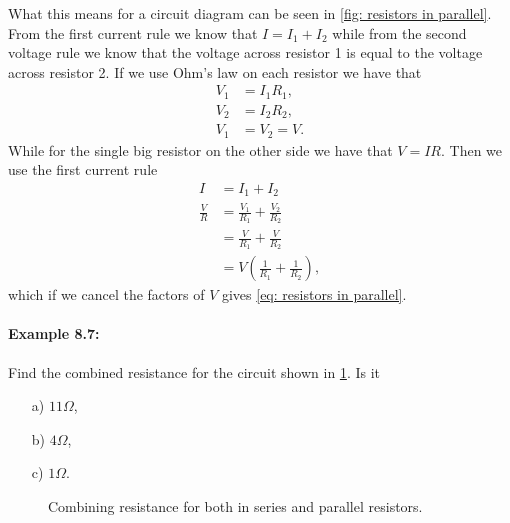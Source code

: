 \documentclass[a4paper,12pt]{book}
\begin{document}
What this means for a circuit diagram can be seen in \cref{fig: resistors in parallel}.  From the first current rule we know that $I=I_{1}+I_{2}$ while from the second voltage rule we know that the voltage across resistor 1 is equal to the voltage across resistor 2. If we use Ohm's law on each resistor we have that 
\begin{align*}
V_{1}&=I_{1} R_{1},\\
V_{2}&=I_{2} R_{2},\\
V_{1}&=V_{2}=V.
\end{align*}
While for the single big resistor on the other side we have that $V=IR$.  Then we use the first current rule 
\begin{align*}
I&=I_{1}+I_{2}\\
\frac{V}{R}&=\frac{V_{1}}{R_{1}}+\frac{V_{2}}{R_{2}}\\
&=\frac{V}{R_{1}}+\frac{V}{R_{2}}\\
&=V\left(\frac{1}{R_{1}}+\frac{1}{R_{2}}\right),
\end{align*}
which if we cancel the factors of $V$ gives \cref{eq: resistors in parallel}.

\paragraph{Example 8.7:} Find the combined resistance for the circuit shown in \cref{fig: combining resistance example}. Is it
\begin{itemize}
\setlength{\itemsep}{-5pt}
    \item[a)] $11\Omega$,
    \item[b)] $4\Omega$,
    \item[c)] $1\Omega$.
\end{itemize}

  \begin{figure}[ht]
    \centering
    \caption{Combining resistance for both in series and parallel resistors.}
    \label{fig: combining resistance example}
\end{figure}
\end{document}
